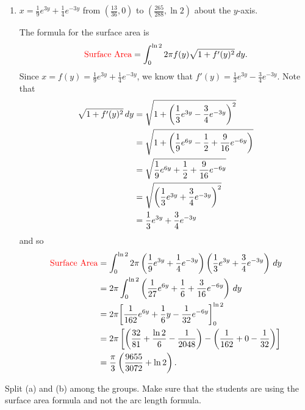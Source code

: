 \documentclass[]{ximera}
\begin{document}
\begin{problem}
\begin{enumerate}
		\item  $x = \frac{1}{9} e^{3y} + \frac{1}{4} e^{-3y}$ from $\left( \frac{13}{36}, 0 \right)$ to $\left( \frac{265}{288}, \ln 2 \right)$ about the $y$-axis.
		\begin{freeResponse}
		The formula for the surface area is
			\[
			\text{{\color{red} Surface Area}} = \int_0^{\ln 2} 2 \pi f(y) \sqrt{1+f'(y)^2} \,d y.
			\]
		Since $x = f(y) = \frac{1}{9} e^{3y} + \frac{1}{4} e^{-3y}$, 
		we know that $f'(y) = \frac{1}{3} e^{3y} - \frac{3}{4} e^{-3y}$.  
		Note that
			\begin{align*}
			\sqrt{1+f'(y)^2} \,d y  &= \sqrt{1+ \left( \frac{1}{3}e^{3y} - \frac{3}{4}e^{-3y} \right)^2}  \\
			&=  \sqrt{1+ \left( \frac{1}{9}e^{6y} - \frac{1}{2} + \frac{9}{16}e^{-6y} \right)}  \\
			&= \sqrt{ \frac{1}{9}e^{6y} + \frac{1}{2} + \frac{9}{16}e^{-6y} }   \\
			&= \sqrt{ \left( \frac{1}{3}e^{3y} + \frac{3}{4}e^{-3y} \right)^2}  \\
			&= \frac{1}{3}e^{3y} + \frac{3}{4}e^{-3y}
			\end{align*}
		and so
			\begin{align*}
			\text{{\color{red} Surface Area}} &= \int_0^{\ln 2} 2 \pi \left( \frac{1}{9} e^{3y} + \frac{1}{4} e^{-3y} \right) \left( \frac{1}{3}e^{3y} + \frac{3}{4}e^{-3y} \right) \,d y  \\
			&= 2 \pi \int_0^{\ln 2} \left( \frac{1}{27}e^{6y} + \frac{1}{6} + \frac{3}{16}e^{-6y} \right) \,d y  \\
			&= 2 \pi \bigg[ \frac{1}{162}e^{6y} + \frac{1}{6}y - \frac{1}{32}e^{-6y} \bigg]_0^{\ln 2}  \\
			&= 2 \pi \left[ \left( \frac{32}{81} + \frac{\ln 2}{6} - \frac{1}{2048} \right) - \left( \frac{1}{162} + 0 - \frac{1}{32} \right) \right]  \\
			&= \frac{\pi}{3} \left( \frac{9655}{3072} + \ln 2 \right).
			\end{align*}
		\end{freeResponse}
		
	\end{enumerate}
	
\end{problem}

\begin{instructorNotes}
Split (a) and (b) among the groups.  
Make sure that the students are using the surface area formula and not the arc length formula.
\end{instructorNotes}
\end{document}
